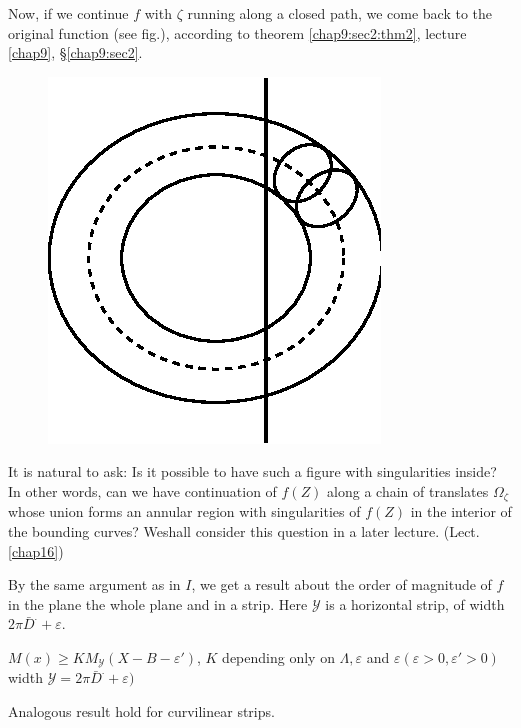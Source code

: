 Now, if we continue $f$ with $\zeta$ running along a closed path, we
come back to the original function (see fig.), according to theorem
\ref{chap9:sec2:thm2}, lecture \ref{chap9}, \S \ref{chap9:sec2}. 

\begin{figure}[H]
\centerline{\includegraphics{vol15-figures/fig15-10.eps}}
\end{figure}

It is natural to ask: Is it possible to have such a figure with
singularities inside? In other words, can we have continuation of $f
(Z)$ along a chain of translates $\Omega_\zeta$ whose union forms an
annular region with singularities of $f (Z)$ in the interior of the
bounding curves? We\pageoriginale shall consider this question in a later
lecture. (Lect. \ref{chap16}) 

By the same argument as in $I$, we get a result about the order of
magnitude of $f$ in the plane the whole plane and in a strip. Here
$\mathscr{Y}$ is a horizontal strip, of width $2 \pi \bar{D}^. +
\varepsilon$. 
\begin{theorem*}
 $M (x) \ge K M_\mathscr{Y} (X - B - \varepsilon')$, $K$ depending
 only on $\Lambda, \varepsilon$ and $\varepsilon ( \varepsilon > 0
 , \varepsilon' > 0)$ width $\mathscr{Y} = 2 \pi \bar{D}^. +
 \varepsilon)$ 
\end{theorem*}

Analogous result hold for curvilinear strips.
